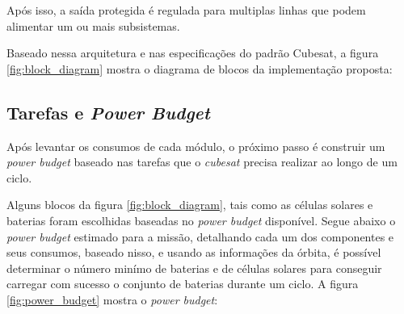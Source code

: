 Após isso, a saída protegida é regulada para multiplas linhas que podem alimentar um ou mais subsistemas. 

Baseado nessa arquitetura e nas especificações do padrão Cubesat, a figura \ref{fig:block_diagram} mostra o diagrama de blocos da implementação proposta:

\noindent
\begin{minipage}{\linewidth}
\label{fig:block_diagram}
\end{minipage}

\subsection{Tarefas e \textit{Power Budget}}

Após levantar os consumos de cada módulo, o próximo passo é construir um \textit{power budget} baseado nas tarefas que o \textit{cubesat} precisa realizar ao longo de um ciclo.  

Alguns blocos da figura \ref{fig:block_diagram}, tais como as células solares e baterias foram escolhidas baseadas no \textit{power budget} disponível. Segue abaixo o \textit{power budget} estimado para a missão, detalhando cada um dos componentes e seus consumos, baseado nisso, e usando as informações da órbita, é possível determinar o número minímo de baterias e de células solares para conseguir carregar com sucesso o conjunto de baterias durante um ciclo. A figura \ref{fig:power_budget} mostra o \textit{power budget}:

\noindent
\begin{minipage}{\linewidth}
\label{fig:power_budget}
\end{minipage}

